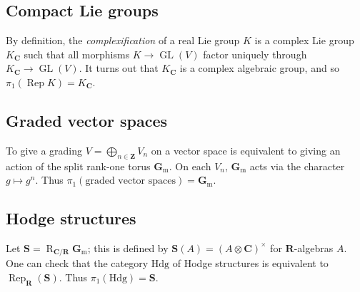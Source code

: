 \documentclass{article}
\DeclareMathOperator{\GL}{GL}
\DeclareMathOperator{\rep}{Rep}
\DeclareMathOperator{\weil}{R}
\newcommand{\dC}{\mathbf{C}}
\newcommand{\dR}{\mathbf{R}}
\newcommand{\dS}{\mathbf{S}}
\newcommand{\dZ}{\mathbf{Z}}
\newcommand{\Gm}{\mathbf{G}_\mathrm{m}}
\newcommand{\hodge}{\mathrm{Hdg}}
\begin{document}
\subsection{Compact Lie groups}

By definition, the \emph{complexification} of a real Lie group $K$ is a complex 
Lie group $K_\dC$ such that all morphisms $K\to \GL(V)$ factor uniquely through 
$K_\dC\to\GL(V)$. It turns out that $K_\dC$ is a complex algebraic group, and 
so $\pi_1(\rep K)=K_\dC$. 


\subsection{Graded vector spaces}

To give a grading $V=\bigoplus_{n\in \dZ} V_n$ on a vector space is equivalent 
to giving an action of the split rank-one torus $\Gm$. On each $V_n$, $\Gm$ 
acts via the character $g\mapsto g^n$. Thus 
$\pi_1(\text{graded vector spaces})=\Gm$. 


\subsection{Hodge structures}

Let $\dS=\weil_{\dC/\dR}\Gm$; this is defined by $\dS(A)=(A\otimes\dC)^\times$ 
for $\dR$-algebras $A$. One can check that the category $\hodge$ of Hodge 
structures is equivalent to $\rep_\dR(\dS)$. Thus $\pi_1(\hodge)=\dS$. 





\printbibliography
\end{document}
